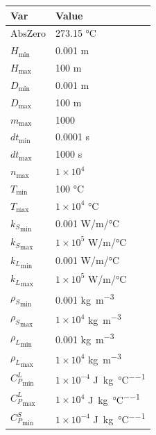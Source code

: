 \documentclass[12pt, titlepage]{article}
\begin{document}
\begin{table}[!h]
\caption{Specification Parameter Values} \label{TblSpecParams}
\renewcommand{\arraystretch}{1.2}
\noindent \begin{longtable*}{l l} 
  \toprule
  \textbf{Var} & \textbf{Value} \\
  \midrule 
  $\mbox{AbsZero}$ &  273.15 \si{\celsius}\\
  $H_{\mbox{min}}$ & 0.001 \si{\metre}\\
  $H_{\mbox{max}}$ & 100 \si{\metre}\\
  $D_{\mbox{min}}$ & 0.001 \si{\metre}\\
  $D_{\mbox{max}}$ & 100 \si{\metre}\\
  $m_{\mbox{max}}$ & 1000\\
  $dt_{\mbox{min}}$ & 0.0001 \si{\second}\\
  $dt_{\mbox{max}}$ & 1000 \si{\second}\\
  $n_{\mbox{max}}$ & $1 \times 10^4$\\
  $T_{\mbox{min}}$ &  100 \si{\celsius}\\
  $T_{\mbox{max}}$ &  $1 \times 10^4$ \si{\celsius}\\
  ${k_S}_{\mbox{min}}$ & 0.001 \si[per-mode=symbol] {\watt \per \metre \per \celsius}\\
  ${k_S}_{\mbox{max}}$ & $1 \times 10^5$ \si[per-mode=symbol] {\watt \per \metre \per \celsius}\\
  ${k_L}_{\mbox{min}}$ & 0.001 \si[per-mode=symbol] {\watt \per \metre \per \celsius}\\
  ${k_L}_{\mbox{max}}$ & $1 \times 10^5$ \si[per-mode=symbol] {\watt \per \metre \per \celsius}\\
  ${\rho_S}_{\mbox{min}}$ & 0.001 \si{\kilogram \per \cubic \metre}\\
  ${\rho_S}_{\mbox{max}}$ & $1 \times 10^4$ \si{\kilogram \per \cubic \metre}\\
  ${\rho_L}_{\mbox{min}}$ & 0.001 \si{\kilogram \per \cubic \metre}\\
  ${\rho_L}_{\mbox{max}}$ & $1 \times 10^4$ \si{\kilogram \per \cubic \metre}\\
   ${C_P^L}_{\mbox{min}}$ & $1 \times 10^{-4}$ \si{\joule \per \kilogram \per \celsius}\\
  ${C_P^L}_{\mbox{max}}$ & $1 \times 10^{4}$ \si{\joule \per \kilogram \per \celsius}\\
  ${C_P^S}_{\mbox{min}}$ & $1 \times 10^{-4}$ \si{\joule \per \kilogram \per \celsius}\\

\end{longtable*}
\end{table}
\end{document}
